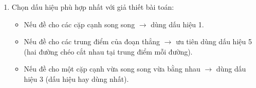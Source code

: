 \begin{enumerate}
\item Chọn dấu hiệu phù hợp nhất với giả thiết bài toán:
\begin{itemize}
\item Nếu đề cho các cặp cạnh song song $\rightarrow$ dùng dấu hiệu 1.
\item Nếu đề cho các trung điểm của đoạn thẳng $\rightarrow$ ưu tiên dùng dấu hiệu 5 (hai đường chéo cắt nhau tại trung điểm mỗi đường).
\item Nếu đề cho một cặp cạnh vừa song song vừa bằng nhau $\rightarrow$ dùng dấu hiệu 3 (dấu hiệu hay dùng nhất).
\end{itemize}
\end{enumerate}
